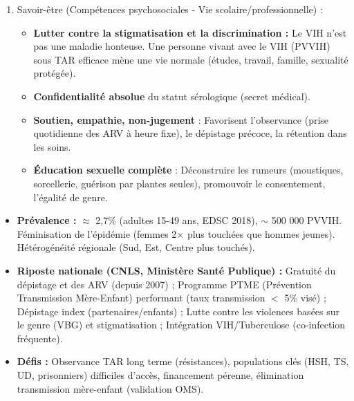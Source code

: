 \documentclass[11pt]{article}
\newcommand{\cle}[1]{{\popxbold\color{popdark}#1}}
\begin{document}
\begin{methode}
\begin{enumerate}
\begin{itemize}
\item \textbf{Secondaire :} \textbf{Dépistage Volontaire (DV)} ou Dépistage Proposé par le Prestataire (DPP) ; Accès universel au \textbf{TAR} (Traitement Antirétroviral) immédiat (« Treat All ») $\rightarrow$ Charge Virale (CV) \textbf{indétectable} ($<$ 50 copies/mL) = \textbf{Intransmissible} (I=I).
\item \textbf{Tertiaire / PTME :} Prise en charge globale femme enceinte séropositive (TAR vie entière, accouchement sécurisé, prophylaxie ARV nouveau-né, conseil alimentation : lait maternel exclusif 6 mois si TAR efficace + CV indétectable, sinon lait de substitution sûr).
\end{itemize}
\item \cle{Savoir-être (Compétences psychosociales - Vie scolaire/professionnelle)} :
\begin{itemize}
\item \textbf{Lutter contre la stigmatisation et la discrimination :} Le VIH n'est pas une maladie honteuse. Une personne vivant avec le VIH (PVVIH) sous TAR efficace mène une vie normale (études, travail, famille, sexualité protégée).
\item \textbf{Confidentialité absolue} du statut sérologique (secret médical).
\item \textbf{Soutien, empathie, non-jugement} : Favorisent l'observance (prise quotidienne des ARV à heure fixe), le dépistage précoce, la rétention dans les soins.
\item \textbf{Éducation sexuelle complète} : Déconstruire les rumeurs (moustiques, sorcellerie, guérison par plantes seules), promouvoir le consentement, l'égalité de genre.
\end{itemize}
\end{enumerate}
\end{methode}

\begin{savaistu}
\begin{itemize}
\item \textbf{Prévalence :} $\approx$ 2,7\% (adultes 15-49 ans, EDSC 2018), $\sim$ 500 000 PVVIH. Féminisation de l'épidémie (femmes 2$\times$ plus touchées que hommes jeunes). Hétérogénéité régionale (Sud, Est, Centre plus touchés).
\item \textbf{Riposte nationale (CNLS, Ministère Santé Publique) :} Gratuité du dépistage et des ARV (depuis 2007) ; Programme PTME (Prévention Transmission Mère-Enfant) performant (taux transmission $<$ 5\% visé) ; Dépistage index (partenaires/enfants) ; Lutte contre les violences basées sur le genre (VBG) et stigmatisation ; Intégration VIH/Tuberculose (co-infection fréquente).
\item \textbf{Défis :} Observance TAR long terme (résistances), populations clés (HSH, TS, UD, prisonniers) difficiles d'accès, financement pérenne, élimination transmission mère-enfant (validation OMS).
\end{itemize}
\end{savaistu}
\end{document}
